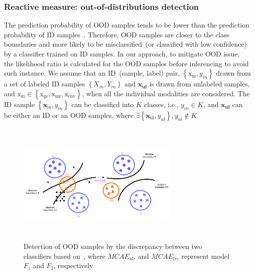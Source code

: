 \subsubsection{Reactive measure: out-of-distributions detection}
\noindent The prediction probability of OOD samples tends to be lower than the prediction probability of ID samples~\cite{OOD18}. Therefore, OOD samples are closer to the class boundaries and more likely to be misclassified~(or classified with low confidence) by a classifier trained on ID samples. In our approach, to mitigate OOD issue, the likelihood ratio is calculated for the OOD samples before inferencing to avoid such instance.  
We assume that an ID~(sample, label) pair, $\left\{\mathrm{x}_{\text {in}}, y_{in}\right\}$ drawn from a set of labeled ID samples $\left\{X_{in}, Y_{in}\right\}$ and $\mathbf{x}_{\mathbf{ul}}$ is drawn from unlabeled samples, and $\mathrm{x}_\text{in} \in \left\{\mathrm{x}_{\text {ge}}, \mathrm{x}_{\text {mr}}, \mathrm{x}_{\text {cnv}}\right\}$, when all the individual modalities are considered. The ID sample $\left\{\mathbf{x}_{\text {in}}, y_{in}\right\}$ can be classified into $K$ classes, i.e., $y_{in} \in K$, and $\mathbf{x}_{\mathbf{ul}}$ can be either an ID or an OOD samples, where $\exists\left\{\mathbf{x}_{\text {ul}}, y_{ul}\right\}, y_{ul} \notin K$. 

\begin{figure}
    \centering
    \includegraphics[width=0.7\textwidth,height=60mm]{images/ood_ex_1.png}
    \caption{Detection of OOD samples by the discrepancy between two classifiers based on~\cite{OOD19}, where $MCAE_{slr}$ and $MCAE_{lrc}$ represent model $F_1$ and $F_2$, respectively}
    \label{fig:ood_detection_example}
    \vspace{-4mm}
\end{figure}

